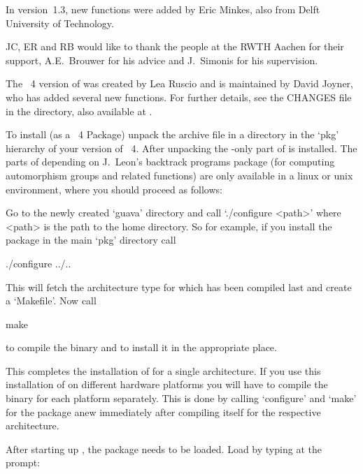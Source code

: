 In version~1.3, new functions were added by Eric Minkes, also from Delft
University of Technology.

JC, ER and RB would like to  thank the {\GAP} people at the RWTH Aachen for
their support, A.E.~Brouwer for his advice and J.~Simonis for his
supervision.

The {\GAP}~4 version of {\GUAVA} was created by Lea Ruscio and is maintained
by David Joyner, who has added several new functions. 
For further details, see the CHANGES file in the
{\GUAVA} directory, also available at 
.


To install {\GUAVA} (as a {\GAP}~4  Package) unpack the archive  file
in a directory in the `pkg' hierarchy of your version of  {\GAP}~4. 
After unpacking {\GUAVA} the {\GAP}-only part of {\GUAVA} is installed.
The parts of {\GUAVA} depending on J.~Leon's backtrack  programs  package
(for  computing  automorphism  groups and related functions)  
are  only  available  in  a linux or unix
environment, where you should proceed as follows:

Go to the newly created `guava' directory and call  `./configure  <path>'
where <path> is the path to the {\GAP} home directory. So for example, if
you install the package in the main `pkg' directory call

\begintt
./configure ../..
\endtt

This will fetch the architecture type for which {\GAP} has been  compiled
last and create a `Makefile'. Now call

\begintt
make
\endtt

to compile the binary and to install it in the appropriate place.

This completes the installation of {\GUAVA} for a single architecture. If
you use this installation of {\GUAVA} on different hardware platforms you
will have to compile the binary for each  platform  separately.  This  is
done by calling `configure' and `make' for the package  anew  immediately
after compiling {\GAP} itself for the respective  architecture. 



After starting up {\GAP}, the  {\GUAVA} package needs  to be loaded. Load
{\GUAVA} by typing at the {\GAP} prompt:

